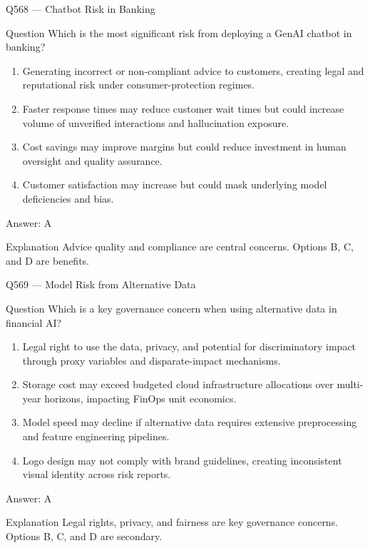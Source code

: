 \documentclass[aspectratio=169,8pt]{beamer}
\begin{document}
	\begin{frame}{Q568 --- Chatbot Risk in Banking}
		\begin{block}{Question}
			Which is the most significant risk from deploying a GenAI chatbot in banking?
			\begin{enumerate}
				\item Generating incorrect or non-compliant advice to customers, creating legal and reputational risk under consumer-protection regimes.
				\item Faster response times may reduce customer wait times but could increase volume of unverified interactions and hallucination exposure.
				\item Cost savings may improve margins but could reduce investment in human oversight and quality assurance.
				\item Customer satisfaction may increase but could mask underlying model deficiencies and bias.
			\end{enumerate}
		\end{block}
		\begin{exampleblock}{Answer: A}\end{exampleblock}
		\begin{block}{Explanation}
			Advice quality and compliance are central concerns. Options B, C, and D are benefits.
		\end{block}
	\end{frame}
	
	\begin{frame}{Q569 --- Model Risk from Alternative Data}
		\begin{block}{Question}
			Which is a key governance concern when using alternative data in financial AI?
			\begin{enumerate}
				\item Legal right to use the data, privacy, and potential for discriminatory impact through proxy variables and disparate-impact mechanisms.
				\item Storage cost may exceed budgeted cloud infrastructure allocations over multi-year horizons, impacting FinOps unit economics.
				\item Model speed may decline if alternative data requires extensive preprocessing and feature engineering pipelines.
				\item Logo design may not comply with brand guidelines, creating inconsistent visual identity across risk reports.
			\end{enumerate}
		\end{block}
		\begin{exampleblock}{Answer: A}\end{exampleblock}
		\begin{block}{Explanation}
			Legal rights, privacy, and fairness are key governance concerns. Options B, C, and D are secondary.
		\end{block}
	\end{frame}
	
\end{document}

